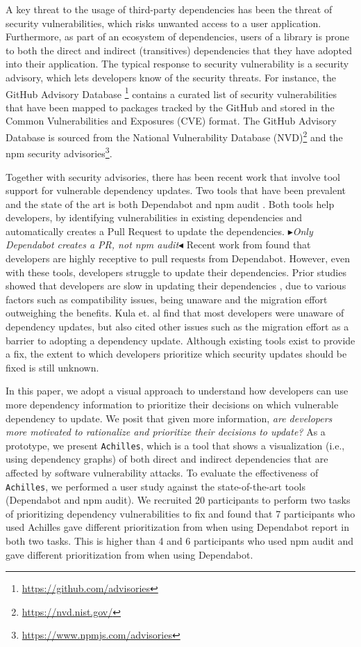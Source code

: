 \documentclass[conference]{IEEEtran}
\newcommand{\boxedtext}[1]{\fbox{\scriptsize\bfseries\textsf{#1}}}
\newcommand{\nota}[2]{
	\boxedtext{#1}
	{\small$\blacktriangleright$\emph{\textsl{#2}}$\blacktriangleleft$}
}
\newcommand{\todo}[1]{{\color{red}\nota{TODO}{#1}}}
\begin{document}
	A key threat to the usage of third-party dependencies has been the threat of security vulnerabilities, which risks unwanted access to a user application. 
	Furthermore, as part of an ecosystem of dependencies, users of a library is prone to both the direct and indirect (transitives) dependencies that they have adopted into their application. 
	The typical response to security vulnerability is a security advisory, which lets developers know of the security threats. 
	For instance, the GitHub Advisory Database \footnote{\url{https://github.com/advisories}} contains a curated list of security vulnerabilities that have been mapped to packages tracked by the GitHub and stored in the Common Vulnerabilities and Exposures (CVE) format.
	The GitHub Advisory Database is sourced from the National Vulnerability Database (NVD)\footnote{\url{https://nvd.nist.gov/}} and the npm security advisories\footnote{\url{https://www.npmjs.com/advisories}}.
	
	Together with security advisories, there has been recent work that involve tool support for vulnerable dependency updates.
	Two tools that have been prevalent and the state of the art is both Dependabot \cite{Web:github_dependabot} and npm audit \cite{Web:npm_audit}. 
	Both tools help developers, by identifying vulnerabilities in existing dependencies and automatically creates a Pull Request to update the dependencies. \todo{Only Dependabot creates a PR, not npm audit}
	Recent work from \citet{Alfadel:MSR2021} found that developers are highly receptive to pull requests from Dependabot.
	However, even with these tools, developers struggle to update their dependencies. 
	Prior studies showed that developers are slow in updating their dependencies \citep{Robbes:2012, Hora:2015, Sawant2016, Bavota:2015, Ihara:2017}, due to various factors such as compatibility issues, being unaware and the migration effort outweighing the benefits.
	Kula et. al \cite{Kula2018} find that most developers were unaware of dependency updates, but also cited other issues such as the migration effort as a barrier to adopting a dependency update.
	Although existing tools exist to provide a fix, the extent to which developers prioritize which security updates should be fixed is still unknown.
	
	In this paper, we adopt a visual approach to understand how developers can use more dependency information to prioritize their decisions on which vulnerable dependency to update. 
	We posit that given more information, \textit{are  developers more motivated to rationalize and prioritize their decisions to update?} 
	As a prototype, we present \texttt{Achilles}, which is a tool that shows a visualization (i.e., using dependency graphs) of both direct and indirect dependencies that are affected by software vulnerability attacks.
	To evaluate the effectiveness of \texttt{Achilles}, we performed a user study against the state-of-the-art tools (Dependabot and npm audit). 
	We recruited 20 participants to perform two tasks of prioritizing dependency vulnerabilities to fix and found that 7 participants who used Achilles gave different prioritization from when using Dependabot report in both two tasks. This is higher than 4 and 6 participants who used npm audit and gave different prioritization from when using Dependabot.
	
\end{document}
